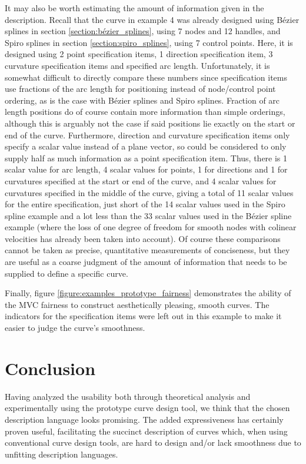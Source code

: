 \documentclass[a4paper]{article}
\begin{document}
			It may also be worth estimating the amount of information given in the description. Recall that the curve in example 4 was already designed using Bézier splines in section \ref{section:bézier_splines}, using 7 nodes and 12 handles, and Spiro splines in section \ref{section:spiro_splines}, using 7 control points. Here, it is designed using 2 point specification items, 1 direction specification item, 3 curvature specification items and specified arc length. Unfortunately, it is somewhat difficult to directly compare these numbers since specification items use fractions of the arc length for positioning instead of node/control point ordering, as is the case with Bézier splines and Spiro splines. Fraction of arc length positions do of course contain more information than simple orderings, although this is arguably not the case if said positions lie exactly on the start or end of the curve. Furthermore, direction and curvature specification items only specify a scalar value instead of a plane vector, so could be considered to only supply half as much information as a point specification item. Thus, there is 1 scalar value for arc length, 4 scalar values for points, 1 for directions and 1 for curvatures specified at the start or end of the curve, and 4 scalar values for curvatures specified in the middle of the curve, giving a total of 11 scalar values for the entire specification, just short of the 14 scalar values used in the Spiro spline example and a lot less than the 33 scalar values used in the Bézier spline example (where the loss of one degree of freedom for smooth nodes with colinear velocities has already been taken into account). Of course these comparisons cannot be taken as precise, quantitative measurements of conciseness, but they are useful as a coarse judgment of the amount of information that needs to be supplied to define a specific curve.

			Finally, figure \ref{figure:examples_prototype_fairness} demonstrates the ability of the MVC fairness to construct aesthetically pleasing, smooth curves. The indicators for the specification items were left out in this example to make it easier to judge the curve's smoothness.

	\section{Conclusion}
	\label{section:conclusion}

		Having analyzed the usability both through theoretical analysis and experimentally using the prototype curve design tool, we think that the chosen description language looks promising. The added expressiveness has certainly proven useful, facilitating the succinct description of curves which, when using conventional curve design tools, are hard to design and/or lack smoothness due to unfitting description languages.
\end{document}
